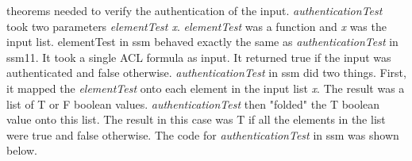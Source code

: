 \begin{itemize}
\begin{itemize}
\begin{itemize}
      theorems needed to verify the authentication of the input.  \textit{authenticationTest} took two
      parameters \textit{elementTest x}.  \textit{elementTest} was a function and \textit{x} was the input list.
      elementTest in ssm behaved exactly the same as \textit{authenticationTest} in ssm11.  It took a single
      ACL formula as input.  It returned true if the input was authenticated and false otherwise.
      \textit{authenticationTest} in ssm did two things.  First, it mapped the \textit{elementTest} onto each
      element in the input list \textit{x}. The result was a list of T or F boolean values.
      \textit{authenticationTest} then "folded" the T boolean value onto this list.  The result in this
      case was T if all the elements in the list were true and false otherwise.  The code for
      \textit{authenticationTest} in ssm was shown below. 
      

\end{itemize}
\end{itemize}
\end{itemize}
